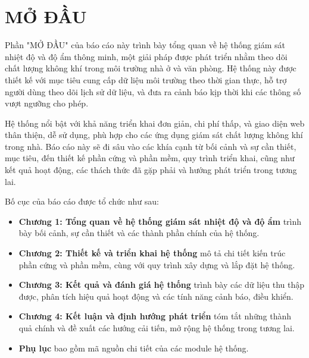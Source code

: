 
\chapter*{MỞ ĐẦU} %

\label{Chapter0} %


Phần "MỞ ĐẦU" của báo cáo này trình bày tổng quan về hệ thống giám sát nhiệt độ và độ ẩm thông minh, một giải pháp được phát triển nhằm theo dõi chất lượng không khí trong môi trường nhà ở và văn phòng. Hệ thống này được thiết kế với mục tiêu cung cấp dữ liệu môi trường theo thời gian thực, hỗ trợ người dùng theo dõi lịch sử dữ liệu, và đưa ra cảnh báo kịp thời khi các thông số vượt ngưỡng cho phép.

Hệ thống nổi bật với khả năng triển khai đơn giản, chi phí thấp, và giao diện web thân thiện, dễ sử dụng, phù hợp cho các ứng dụng giám sát chất lượng không khí trong nhà. Báo cáo này sẽ đi sâu vào các khía cạnh từ bối cảnh và sự cần thiết, mục tiêu, đến thiết kế phần cứng và phần mềm, quy trình triển khai, cũng như kết quả hoạt động, các thách thức đã gặp phải và hướng phát triển trong tương lai.

Bố cục của báo cáo được tổ chức như sau:
\begin{itemize}
	\item \textbf{Chương 1: Tổng quan về hệ thống giám sát nhiệt độ và độ ẩm} trình bày bối cảnh, sự cần thiết và các thành phần chính của hệ thống.
	\item \textbf{Chương 2: Thiết kế và triển khai hệ thống} mô tả chi tiết kiến trúc phần cứng và phần mềm, cùng với quy trình xây dựng và lắp đặt hệ thống.
	\item \textbf{Chương 3: Kết quả và đánh giá hệ thống} trình bày các dữ liệu thu thập được, phân tích hiệu quả hoạt động và các tính năng cảnh báo, điều khiển.
	\item \textbf{Chương 4: Kết luận và định hướng phát triển} tóm tắt những thành quả chính và đề xuất các hướng cải tiến, mở rộng hệ thống trong tương lai.
	\item \textbf{Phụ lục} bao gồm mã nguồn chi tiết của các module hệ thống.
\end{itemize}